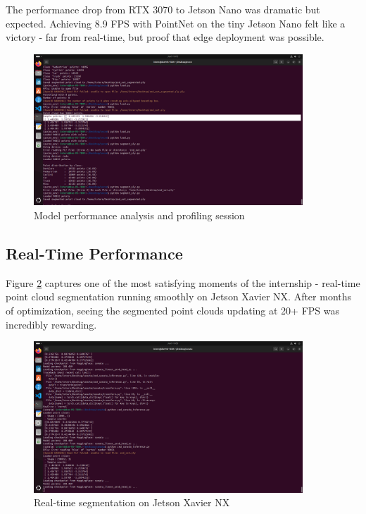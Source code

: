 \documentclass[12pt,a4paper]{report}
\begin{document}
The performance drop from RTX 3070 to Jetson Nano was dramatic but expected. Achieving 8.9 FPS with PointNet on the tiny Jetson Nano felt like a victory - far from real-time, but proof that edge deployment was possible.

\begin{figure}[htbp]
    \centering
    \includegraphics[width=0.9\textwidth]{figures/model_analysis.png}
    \caption{Model performance analysis and profiling session}
    \label{fig:model_analysis}
\end{figure}

\subsection{Real-Time Performance}

Figure \ref{fig:real_time_inference} captures one of the most satisfying moments of the internship - real-time point cloud segmentation running smoothly on Jetson Xavier NX. After months of optimization, seeing the segmented point clouds updating at 20+ FPS was incredibly rewarding.

\begin{figure}[htbp]
    \centering
    \includegraphics[width=0.9\textwidth]{figures/real_time_inference.png}
    \caption{Real-time segmentation on Jetson Xavier NX}
    \label{fig:real_time_inference}
\end{figure}
\end{document}

